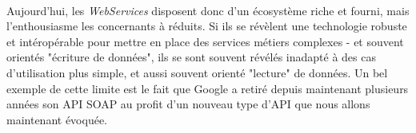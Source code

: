 {  \paragraph{} Aujourd'hui, les \textit{WebServices} disposent donc d'un écosystème riche et fourni,
  mais l'enthousiasme les concernants à réduits. Si ils se révèlent une technologie robuste et
  intéropérable pour mettre en place des services métiers complexes - et souvent orientés "écriture
  de données", ils se sont souvent révélés inadapté à des cas d'utilisation plus simple, et aussi
  souvent orienté "lecture" de données. Un bel exemple de cette limite est le fait que Google a
  retiré depuis maintenant plusieurs années son API SOAP au profit d'un nouveau type d'API que nous
  allons maintenant évoquée.
}


